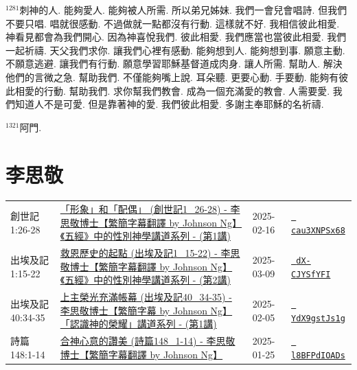 \documentclass{book}
\begin{document}
$^{1281}$刺神的人.
能夠愛人.
能夠被人所需.
所以弟兄姊妹.
我們一會兒會唱詩.
但我們不要只唱.
唱就很感動.
不過做就一點都沒有行動.
這樣就不好.
我相信彼此相愛.
神看見都會為我們開心.
因為神喜悅我們.
彼此相愛.
我們應當也當彼此相愛.
我們一起祈禱.
天父我們求你.
讓我們心裡有感動.
能夠想到人.
能夠想到事.
願意主動.
不願意逃避.
讓我們有行動.
願意學習耶穌基督道成肉身.
讓人所需.
幫助人.
解決他們的言微之急.
幫助我們.
不僅能夠嘴上說.
耳朵聽.
更要心動.
手要動.
能夠有彼此相愛的行動.
幫助我們.
求你幫我們教會.
成為一個充滿愛的教會.
人需要愛.
我們知道人不是可愛.
但是靠著神的愛.
我們彼此相愛.
多謝主奉耶穌的名祈禱.

$^{1321}$阿門.
\newpage



\chapter{李思敬}\label{ch:preacher5}
\begin{multicols}{3}
\minitoc
\end{multicols}
{ \scriptsize


\begin{xltabular}{\textwidth}{|p{0.15\textwidth} p{0.6\textwidth}|p{0.07\textwidth} p{0.1\textwidth}|}
\hline
創世記 1:26-28 & \hyperref[sec:cau3XNPSx68]{「形象」和「配偶」 (創世記1\_26-28) - 李思敬博士【繁簡字幕翻譯 by Johnson Ng】《五經》中的性別神學講道系列 - (第1講)} & 2025-02-16 & \href{https://youtube.com/watch?v=cau3XNPSx68}{\texttt{ cau3XNPSx68}} \\
出埃及記 1:15-22 & \hyperref[sec:dX_CJYSfYFI]{救恩歷史的起點 (出埃及記1\_15-22) - 李思敬博士【繁簡字幕翻譯 by Johnson Ng】《五經》中的性別神學講道系列 - (第2講)} & 2025-03-09 & \href{https://youtube.com/watch?v=dX-CJYSfYFI}{\texttt{ dX-CJYSfYFI}} \\
出埃及記 40:34-35 & \hyperref[sec:YdX9gstJs1g]{上主榮光充滿帳幕 (出埃及記40\_34-35) - 李思敬博士【繁簡字幕 by Johnson Ng】「認識神的榮耀」講道系列 - (第1講)} & 2025-02-05 & \href{https://youtube.com/watch?v=YdX9gstJs1g}{\texttt{ YdX9gstJs1g}} \\
詩篇 148:1-14 & \hyperref[sec:l8BFPdIOADs]{合神心意的讚美 (詩篇148\_1-14) - 李思敬博士【繁簡字幕翻譯 by Johnson Ng】} & 2025-01-25 & \href{https://youtube.com/watch?v=l8BFPdIOADs}{\texttt{ l8BFPdIOADs}} \\
\hline
\end{xltabular}
}
\newpage
\end{document}
